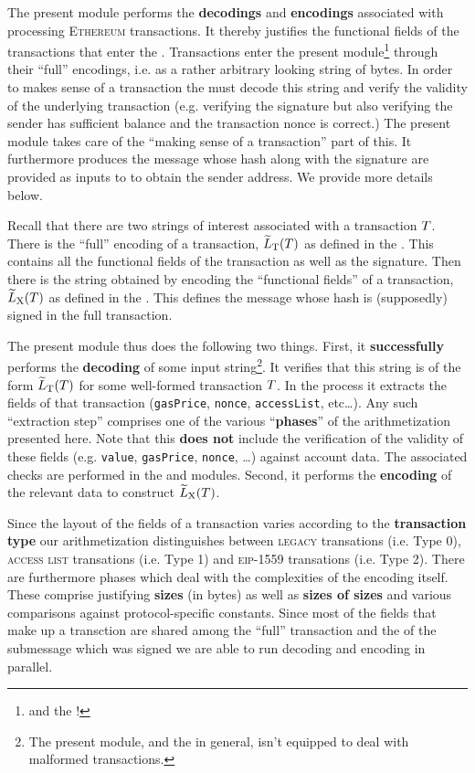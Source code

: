 The present module performs the \rlp{} \textbf{decodings} and \textbf{encodings} associated with processing \textsc{Ethereum} transactions.
It thereby justifies the functional fields of the transactions that enter the \zkEvm{}.
Transactions enter the present module\footnote{and the \zkEvm{}!} through their ``full'' \rlp{} encodings, i.e. as a rather arbitrary looking string of bytes.
In order to makes sense of a transaction the \zkEvm{} must decode this string and verify the validity of the underlying transaction (e.g. verifying the signature but also verifying the sender has sufficient balance and the transaction nonce is correct.)
The present module takes care of the ``making sense of a transaction'' part of this.
It furthermore produces the message whose hash along with the signature are provided as inputs to  to obtain the sender address.
We provide more details below.

Recall that there are two \rlp{} strings of interest associated with a transaction $T$.
There is the ``full'' \rlp{} encoding of a transaction, $\widetilde{L}_{\mathrm{T}}(T)$ as defined in the \cite{EYP-London}.
This contains all the functional fields of the transaction as well as the signature.
Then there is the \rlp{} string obtained by \rlp{} encoding the ``functional fields'' of a transaction, $\widetilde{L}_{\mathrm{X}}(T)$ as defined in the \cite{EYP-London}.
This defines the message whose hash is (supposedly) signed in the full transaction.

The present module thus does the following two things.
First, it \textbf{successfully} performs the \rlp{} \textbf{decoding} of some input string\footnote{The present module, and the \zkEvm{} in general, isn't equipped to deal with malformed transactions.}.
It verifies that this string is of the form $\widetilde{L}_{\mathrm{T}}(T)$ for some well-formed transaction $T$.
In the process it extracts the fields of that transaction (\texttt{gasPrice}, \texttt{nonce}, \texttt{accessList}, etc\dots{}).
Any such ``extraction step'' comprises one of the various ``\textbf{phases}'' of the arithmetization presented here.
Note that this \textbf{does not} include the verification of the validity of these fields (e.g. \texttt{value}, \texttt{gasPrice}, \texttt{nonce}, \dots) against account data.
The associated checks are performed in the \txnDataMod{} and \hubMod{} modules.
Second, it performs the \rlp{} \textbf{encoding} of the relevant data to construct $\widetilde{L}_{\mathrm{X}}(T)$.

Since the layout of the fields of a transaction varies according to the \textbf{transaction type} our arithmetization distinguishes between
\textsc{legacy} transations (i.e. Type 0),
\textsc{access list} transations (i.e. Type 1) and
\textsc{eip-1559} transations (i.e. Type 2).
There are furthermore phases which deal with the complexities of the \rlp{} encoding itself.
These comprise justifying \textbf{sizes} (in bytes) as well as \textbf{sizes of sizes} and various comparisons against protocol-specific constants.
Since most of the fields that make up a transction are shared among the ``full'' transaction \rlp{} and the \rlp{} of the submessage which was signed we are able to run decoding and encoding in parallel.

